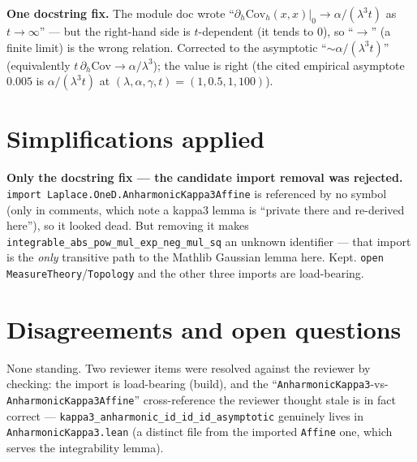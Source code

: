 \documentclass[11pt]{article}
\begin{document}
\textbf{One docstring fix.} The module doc wrote ``$\partial_h\mathrm{Cov}_h(x,x)|_0\to
\alpha/(\lambda^3 t)$ as $t\to\infty$'' --- but the right-hand side is $t$-dependent (it tends to
$0$), so ``$\to$'' (a finite limit) is the wrong relation. Corrected to the asymptotic
``$\sim\alpha/(\lambda^3 t)$'' (equivalently $t\,\partial_h\mathrm{Cov}\to\alpha/\lambda^3$); the
value is right (the cited empirical asymptote $0.005$ is $\alpha/(\lambda^3 t)$ at
$(\lambda,\alpha,\gamma,t)=(1,0.5,1,100)$).

\section{Simplifications applied}
\textbf{Only the docstring fix --- the candidate import removal was rejected.}
\texttt{import Laplace.OneD.AnharmonicKappa3Affine} is referenced by no symbol (only in comments,
which note a kappa3 lemma is ``private there and re-derived here''), so it looked dead. But removing
it makes \texttt{integrable\_abs\_pow\_mul\_exp\_neg\_mul\_sq} an unknown identifier --- that import
is the \emph{only} transitive path to the Mathlib Gaussian lemma here. Kept. \texttt{open
MeasureTheory}/\texttt{Topology} and the other three imports are load-bearing.

\section{Disagreements and open questions}
None standing. Two reviewer items were resolved against the reviewer by checking: the import is
load-bearing (build), and the ``\texttt{AnharmonicKappa3}-vs-\texttt{AnharmonicKappa3Affine}''
cross-reference the reviewer thought stale is in fact correct ---
\texttt{kappa3\_anharmonic\_id\_id\_id\_asymptotic} genuinely lives in \texttt{AnharmonicKappa3.lean}
(a distinct file from the imported \texttt{Affine} one, which serves the integrability lemma).
\end{document}

